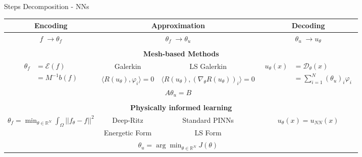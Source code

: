 \begin{frame}{Steps Decomposition - NNs}
	\vspace{10pt}
	\small
	\renewcommand{\arraystretch}{1.3}
	\begin{tabular}{|c|c|c|c|}
		\hline
		\textbf{Encoding} & \multicolumn{2}{c|}{\textbf{Approximation}} & \textbf{Decoding} \\
		\hline
		$f \; \rightarrow \theta_f$ & \multicolumn{2}{c|}{$\theta_f \; \rightarrow \theta_u$} & $\theta_u \; \rightarrow u_\theta$ \\
		\hline
		\multicolumn{4}{c}{ } \\
		\hline
		\multicolumn{4}{|c|}{\textbf{Mesh-based Methods}} \\
		\hline
		\multirow{3}{*}{$\begin{aligned}
				\theta_f&=\mathcal{E}(f) \\
				&=M^{-1}b(f)
			\end{aligned}$} & Galerkin & LS Galerkin & \multirow{3}{*}{$\begin{aligned}
				u_\theta(x)&=\mathcal{D}_\theta(x) \\
				&=\sum_{i=1}^N (\theta_u)_i\varphi_i
			\end{aligned}$} \\
		 & \footnotesize $\langle R(u_\theta),\varphi_i\rangle=0$ & \footnotesize $\langle R(u_\theta),(\nabla_\theta R(u_\theta))_i\rangle=0$ & \\
		\cline{2-3}
		 & \multicolumn{2}{c|}{$A\theta_u=B$} & \\
		\hline
		\multicolumn{4}{c}{ } \\
		\hline
		\multicolumn{4}{|c|}{\textbf{Physically informed learning}} \\
		\hline
		\multirow{3}{*}{\footnotesize $\displaystyle\theta_f=\min_{\theta\in\mathbb{R}^N} \int_\Omega ||f_\theta-f||^2$} & Deep-Ritz & Standard PINNs & \multirow{3}{*}{$u_\theta(x)=u_{NN}(x)$} \\
		 & \footnotesize Energetic Form & \footnotesize LS Form & \\
		\cline{2-3}
		 & \multicolumn{2}{c|}{$\theta_u=\arg\min_{\theta\in \mathbb{R}^N} J(\theta)$} & \\
		\hline
	\end{tabular}
\end{frame}

